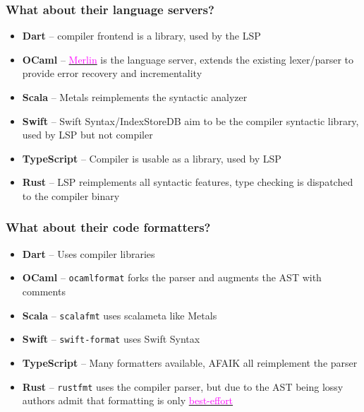 \documentclass[compress,12pt,xcolor={dvipsnames}]{beamer}
\let\oldhref\href
\renewcommand{\href}[2]{\oldhref{#1}{\textcolor{magenta}{#2}}}
\begin{document}
\begin{frame}
	\frametitle{What about their language servers?}

	\begin{itemize}
		\item \textbf{Dart} -- compiler frontend is a library, used by the LSP
		\item \textbf{OCaml} -- \href{https://arxiv.org/pdf/1807.06702}{Merlin} is the language server, extends the existing lexer/parser to provide error recovery and incrementality		\item \textbf{Scala} -- Metals reimplements the syntactic analyzer
		\item \textbf{Swift} -- Swift Syntax/IndexStoreDB aim to be the compiler syntactic library, used by LSP but not compiler
		\item \textbf{TypeScript} -- Compiler is usable as a library, used by LSP
		\item \textbf{Rust} -- LSP reimplements all syntactic features, type checking is dispatched to the compiler binary
	\end{itemize}
\end{frame}

\begin{frame}
	\frametitle{What about their code formatters?}

	\begin{itemize}
		\item \textbf{Dart} -- Uses compiler libraries
		\item \textbf{OCaml} -- \texttt{ocamlformat} forks the parser and augments the AST with comments
		\item \textbf{Scala} -- \texttt{scalafmt} uses scalameta like Metals
		\item \textbf{Swift} -- \texttt{swift-format} uses Swift Syntax
		\item \textbf{TypeScript} -- Many formatters available, AFAIK all reimplement the parser
		\item \textbf{Rust} -- 	\texttt{rustfmt} uses the compiler parser, but due to the AST being lossy authors admit that formatting is only \href{https://github.com/rust-lang/rustfmt/blob/master/Contributing.md\#a-quick-tour-of-rustfmt}{best-effort}
	\end{itemize}

\end{frame}
\end{document}
